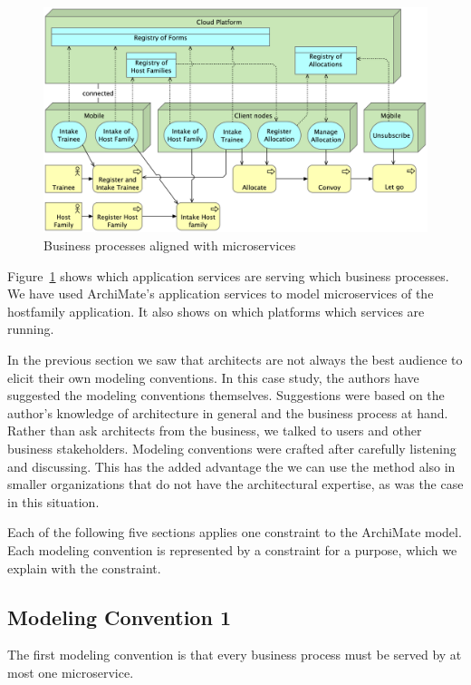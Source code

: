 \documentclass[sn-vancouver]{sn-jnl}%
\theoremstyle{thmstyleone}%
\theoremstyle{thmstyletwo}%
\theoremstyle{thmstylethree}%
\begin{document}
\begin{figure}[hbtp]
 \centering
\includegraphics[clip=true, scale=0.07]{Services voor Uitvoering.png}
\caption{Business processes aligned with microservices}
\label{fig: Alignment of services with business processes}
\end{figure}

Figure~\ref{fig: Alignment of services with business processes} shows which application services are serving which business processes.
We have used ArchiMate's application services to model microservices of the hostfamily application.
It also shows on which platforms which services are running.

In the previous section we saw that architects are not always the best audience to elicit their own modeling conventions.
In this case study, the authors have suggested the modeling conventions themselves.
Suggestions were based on the author's knowledge of architecture in general and the business process at hand.
Rather than ask architects from the business, we talked to users and other business stakeholders.
Modeling conventions were crafted after carefully listening and discussing.
This has the added advantage the we can use the method also in smaller organizations that do not have the architectural expertise,
as was the case in this situation.

Each of the following five sections applies one constraint to the ArchiMate model.
Each modeling convention is represented by a constraint for a purpose,
which we explain with the constraint.

\subsection{Modeling Convention 1}
The first modeling convention is that every business process must be served by at most one microservice.
\end{document}
